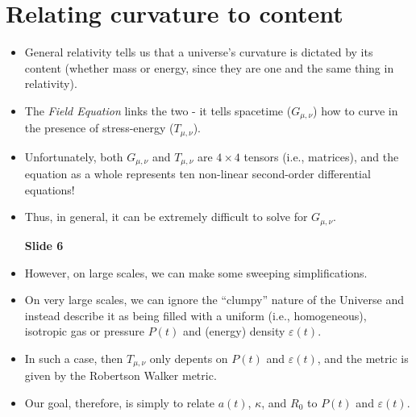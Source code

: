 \documentclass[11pt]{article}
\begin{document}
\section{Relating curvature to content}
\begin{itemize}
\item General relativity tells us that a universe's curvature is dictated by its content (whether mass or energy, since they are one and the same thing in relativity).
\item The {\it Field Equation} links the two - it tells spacetime ($G_{\mu,\nu}$) how to curve in the presence of stress-energy ($T_{\mu, \nu}$).
\item Unfortunately, both $G_{\mu,\nu}$ and $T_{\mu, \nu}$ are $4\times4$ tensors (i.e., matrices), and the equation as a whole represents ten non-linear second-order differential equations!
\item Thus, in general, it can be extremely difficult to solve for $G_{\mu,\nu}$.

{\bf Slide 6}
\item However, on large scales, we can make some sweeping simplifications.
\item On very large scales, we can ignore the ``clumpy'' nature of the Universe and instead describe it as being filled with a uniform (i.e., homogeneous), isotropic gas or pressure $P(t)$ and (energy) density $\varepsilon(t)$.
\item In such a case, then $T_{\mu,\nu}$ only depents on $P(t)$ and $\varepsilon(t)$, and the metric is given by the Robertson Walker metric.
\item Our goal, therefore, is simply to relate $a(t)$, $\kappa$, and $R_0$ to $P(t)$ and $\varepsilon(t)$.
\end{itemize}
\end{document}

